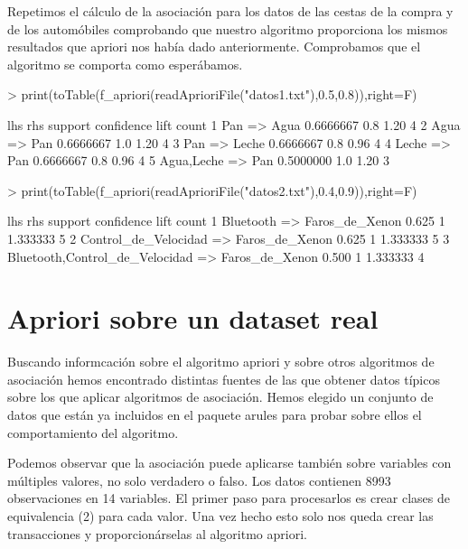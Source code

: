 \documentclass [a4paper] {article}
\begin{document}
Repetimos el cálculo de la asociación para los datos de las cestas de la compra y de los automóbiles comprobando que nuestro algoritmo proporciona
los mismos resultados que apriori nos había dado anteriormente. Comprobamos que el algoritmo se comporta como esperábamos.
\begin{Schunk}
\begin{Sinput}
> print(toTable(f_apriori(readAprioriFile("datos1.txt"),0.5,0.8)),right=F)
\end{Sinput}
\begin{Soutput}
  lhs             rhs     support   confidence lift count
1 {Pan}        => {Agua}  0.6666667 0.8        1.20 4    
2 {Agua}       => {Pan}   0.6666667 1.0        1.20 4    
3 {Pan}        => {Leche} 0.6666667 0.8        0.96 4    
4 {Leche}      => {Pan}   0.6666667 0.8        0.96 4    
5 {Agua,Leche} => {Pan}   0.5000000 1.0        1.20 3    
\end{Soutput}
\begin{Sinput}
> print(toTable(f_apriori(readAprioriFile("datos2.txt"),0.4,0.9)),right=F)
\end{Sinput}
\begin{Soutput}
  lhs                                 rhs              support confidence lift     count
1 {Bluetooth}                      => {Faros_de_Xenon} 0.625   1          1.333333 5    
2 {Control_de_Velocidad}           => {Faros_de_Xenon} 0.625   1          1.333333 5    
3 {Bluetooth,Control_de_Velocidad} => {Faros_de_Xenon} 0.500   1          1.333333 4    
\end{Soutput}
\end{Schunk}

\newpage
\section{Apriori sobre un dataset real}
Buscando informcación sobre el algoritmo apriori y sobre otros algoritmos de asociación hemos encontrado distintas fuentes de las que obtener datos típicos 
sobre los que aplicar algoritmos de asociación.
Hemos elegido un conjunto de datos que están ya incluidos en el paquete arules para probar sobre ellos el comportamiento del algoritmo.

Podemos observar que la asociación puede aplicarse también sobre variables con múltiples valores, no solo verdadero o falso.
Los datos contienen 8993 observaciones en 14 variables. El primer paso para procesarlos es crear clases de equivalencia (2) para cada valor.
Una vez hecho esto solo nos queda crear las transacciones y proporcionárselas al algoritmo apriori.
\end{document}

